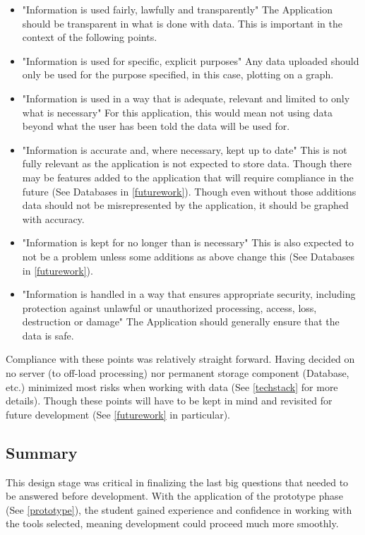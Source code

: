 \begin{itemize}
    \item "Information is used fairly, lawfully and transparently" \cite{govuk_2018_data} The Application should be transparent in what is done with data. This is important in the context of the following points.
    \item "Information is used for specific, explicit purposes" \cite{govuk_2018_data} Any data uploaded should only be used for the purpose specified, in this case, plotting on a graph.
    \item "Information is used in a way that is adequate, relevant and limited to only what is necessary" \cite{govuk_2018_data} For this application, this would mean not using data beyond what the user has been told the data will be used for.
    \item "Information is accurate and, where necessary, kept up to date" \cite{govuk_2018_data} This is not fully relevant as the application is not expected to store data. Though there may be features added to the application that will require compliance in the future (See Databases in \ref{futurework}). Though even without those additions data should not be misrepresented by the application, it should be graphed with accuracy.
    \item "Information is kept for no longer than is necessary" \cite{govuk_2018_data} This is also expected to not be a problem unless some additions as above change this (See Databases in \ref{futurework}).
    \item "Information is handled in a way that ensures appropriate security, including protection against unlawful or unauthorized processing, access, loss, destruction or damage" \cite{govuk_2018_data} The Application should generally ensure that the data is safe.
\end{itemize}

Compliance with these points was relatively straight forward. Having decided on no server (to off-load processing) nor permanent storage component (Database, etc.) minimized most risks when working with data (See \ref{techstack} for more details). Though these points will have to be kept in mind and revisited for future development (See \ref{futurework} in particular).

\subsection{Summary}
This design stage was critical in finalizing the last big questions that needed to be answered before development. With the application of the prototype phase (See \ref{prototype}), the student gained experience and confidence in working with the tools selected, meaning development could proceed much more smoothly.
